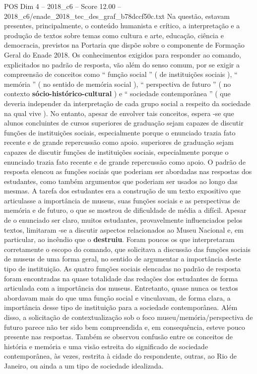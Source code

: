 \begin{textsample}{POS Dim 4 – 2018\_c6 – Score 12.00 – 2018\_c6/enade\_2018\_tec\_des\_graf\_b78dccf50c.txt}
Na questão, estavam presentes, principalmente, o conteúdo humanista e crítico, a interpretação e a produção de textos sobre temas como cultura e arte, educação, ciência e democracia, previstos na Portaria que dispõe sobre o componente de Formação Geral do Enade 2018.
Os conhecimentos exigidos para responder ao comando, explicitados no padrão de resposta, vão além do senso comum, por se exigir a compreensão de conceitos como “ função social ” ( de instituições sociais ), “ memória ” ( no sentido de memória social ), “ perspectiva de futuro ” ( no contexto \textbf{sócio-histórico-cultural} ) e “ sociedade contemporânea ” ( que deveria independer da interpretação de cada grupo social a respeito da sociedade na qual vive ).
No entanto, apesar de envolver tais conceitos, espera -se que alunos concluintes de cursos superiores de graduação sejam capazes de discutir funções de instituições sociais, especialmente porque o enunciado trazia fato recente e de grande repercussão como apoio. superiores de graduação sejam capazes de discutir funções de instituições sociais, especialmente porque o enunciado trazia fato recente e de grande repercussão como apoio.
O padrão de resposta elencou as funções sociais que poderiam ser abordadas nas respostas dos estudantes, como também argumentos que poderiam ser usados ao longo das mesmas.
A tarefa dos estudantes era a construção de um texto expositivo que articulasse a importância de museus, suas funções sociais e as perspectivas de memória e de futuro, o que se mostrou de dificuldade de média a difícil.
Apesar de o enunciado ser claro, muitos estudantes, provavelmente influenciados pelos textos, limitaram -se a discutir aspectos relacionados ao Museu Nacional e, em particular, ao incêndio que o \textbf{destruiu}.
Foram poucos os que interpretaram corretamente o escopo do comando, que solicitava a discussão das funções sociais de museus de uma forma geral, no sentido de argumentar a importância deste tipo de instituição.
As quatro funções sociais elencadas no padrão de resposta foram encontradas na quase totalidade das redações dos estudantes de forma articulada com a importância dos museus.
Entretanto, quase nunca os textos abordavam mais do que uma função social e vinculavam, de forma clara, a importância desse tipo de instituição para a sociedade contemporânea.
Além disso, a solicitação de contextualização sob o foco museu/memória/perspectiva de futuro parece não ter sido bem compreendida e, em consequência, esteve pouco presente nas respostas.
Também se observou confusão entre os conceitos de história e memória e uma visão estreita do significado de sociedade contemporânea, às vezes, restrita à cidade do respondente, outras, ao Rio de Janeiro, ou ainda a um tipo de sociedade idealizada.

\end{textsample}
